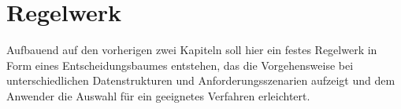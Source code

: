 \chapter{Regelwerk}

Aufbauend auf den vorherigen zwei Kapiteln soll hier ein festes Regelwerk in Form eines Entscheidungsbaumes entstehen, das die Vorgehensweise bei unterschiedlichen Datenstrukturen und Anforderungsszenarien aufzeigt und dem Anwender die Auswahl für ein geeignetes Verfahren erleichtert.